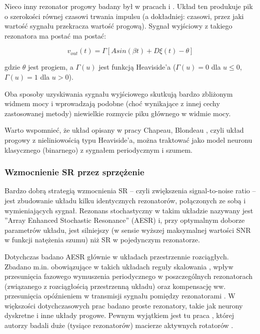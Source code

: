   Nieco inny rezonator progowy badany był w pracach \cite{blondeau_e53} i \cite{blondeau_e55}. Układ ten produkuje pik o szerokości równej czasowi trwania impulsu (a dokładniej: czasowi, przez jaki wartość sygnału przekracza wartość progową). Sygnał wyjściowy z takiego rezonatora ma postać ma postać:

  \begin{equation} \label{sr:gingl2}
    v_{out}(t) = \Gamma[A sin (\beta t) + D \xi(t) - \theta]
  \end{equation}

  gdzie $\theta$ jest progiem, a $\Gamma(u)$ jest funkcją Heaviside'a ($\Gamma(u) = 0$ dla $u \leq 0$, $\Gamma(u) = 1$ dla $u > 0$).

  Oba sposoby uzyskiwania sygnału wyjściowego skutkują bardzo zbliżonym widmem mocy i wprowadzają podobne (choć wynikające z innej cechy zastosowanej metody) niewielkie rozmycie piku głównego w widmie mocy.

  Warto wspomnieć, że układ opisany w pracy Chapeau, Blondeau \cite{blondeau_e53}, czyli układ progowy z nieliniowością typu Heaviside'a, można traktować jako model neuronu klasycznego (binarnego) z sygnałem periodycznym i szumem.

  \subsubsection{Wzmocnienie SR przez sprzężenie}
  \label{sec:wzmocnienie_przez_sprzezenie}

  Bardzo dobrą strategią wzmocnienia SR -- czyli zwiększenia signal-to-noise ratio -- jest zbudowanie układu kilku identycznych rezonatorów, połączonych ze sobą i wymieniających sygnał. Rezonans stochastyczny w takim układzie nazywany jest ''Array Enhanced Stochastic Resonance'' (AESR) \cite{lindner_meadows} i, przy optymalnym doborze parametrów układu, jest silniejszy (w sensie wyższej maksymalnej wartości SNR w funkcji natężenia szumu) niż SR w pojedynczym rezonatorze.

  Dotychczas badano AESR głównie w układach przestrzennie rozciągłych. Zbadano m.in. obowiązujące w takich układach reguły skalowania \cite{lindner_meadows} \cite{tanabe_shimokawa}, wpływ przesunięcia fazowego wymuszenia periodycznego w poszczególnych rezonatorach (związanego z rozciągłością przestrzenną układu) \cite{ijmpb_14_8} oraz kompensację ww. przesunięcia opóźnieniem w transmisji sygnału pomiędzy rezonatorami \cite{ijmpb_23_2}. W większości dotychczasowych prac badano proste rezonatory, takie jak neurony dyskretne i inne układy progowe. Pewnym wyjątkiem jest tu praca \cite{tanabe_shimokawa}, której autorzy badali duże (tysiące rezonatorów) macierze aktywnych rotatorów \cite{wiesenfeld} \cite{pakdaman}.

